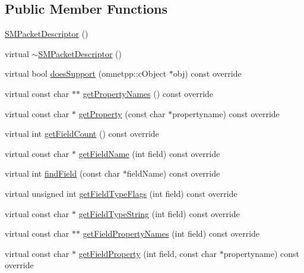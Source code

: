 \subsection*{Public Member Functions}
\begin{DoxyCompactItemize}
\item 
\hyperlink{classsmart3p_1_1SMPacketDescriptor_ae9d949f5e29ab9f05d4cb6274dfa3200}{S\+M\+Packet\+Descriptor} ()
\item 
virtual \hyperlink{classsmart3p_1_1SMPacketDescriptor_ad0c4ce884a30eb6d2d3b318b71cd50d5}{$\sim$\+S\+M\+Packet\+Descriptor} ()
\item 
virtual bool \hyperlink{classsmart3p_1_1SMPacketDescriptor_ad6d1c39ed935c74e530518d0c08c96b1}{does\+Support} (omnetpp\+::c\+Object $\ast$obj) const override
\item 
virtual const char $\ast$$\ast$ \hyperlink{classsmart3p_1_1SMPacketDescriptor_a0b6d929f61cf3bf70beabd18b27ded6b}{get\+Property\+Names} () const override
\item 
virtual const char $\ast$ \hyperlink{classsmart3p_1_1SMPacketDescriptor_afaf28d721c4a737e995c2fa96f3980b6}{get\+Property} (const char $\ast$propertyname) const override
\item 
virtual int \hyperlink{classsmart3p_1_1SMPacketDescriptor_ae23810945a57fd295d690d93c293965c}{get\+Field\+Count} () const override
\item 
virtual const char $\ast$ \hyperlink{classsmart3p_1_1SMPacketDescriptor_a97db785c3dba89aac64029498029c49b}{get\+Field\+Name} (int field) const override
\item 
virtual int \hyperlink{classsmart3p_1_1SMPacketDescriptor_af4c4779c44e83e12d113832d241226d2}{find\+Field} (const char $\ast$field\+Name) const override
\item 
virtual unsigned int \hyperlink{classsmart3p_1_1SMPacketDescriptor_a6340a7ad7292e0479cff02e47fb40da6}{get\+Field\+Type\+Flags} (int field) const override
\item 
virtual const char $\ast$ \hyperlink{classsmart3p_1_1SMPacketDescriptor_a77f40e1520c19adb3834810ef0e1755a}{get\+Field\+Type\+String} (int field) const override
\item 
virtual const char $\ast$$\ast$ \hyperlink{classsmart3p_1_1SMPacketDescriptor_ab612eab1c11dff9714e277fe7dd1ab3c}{get\+Field\+Property\+Names} (int field) const override
\item 
virtual const char $\ast$ \hyperlink{classsmart3p_1_1SMPacketDescriptor_a6033e9cc8d7c9cfc5e6f0e0c889bf200}{get\+Field\+Property} (int field, const char $\ast$propertyname) const override

\end{DoxyCompactItemize}
